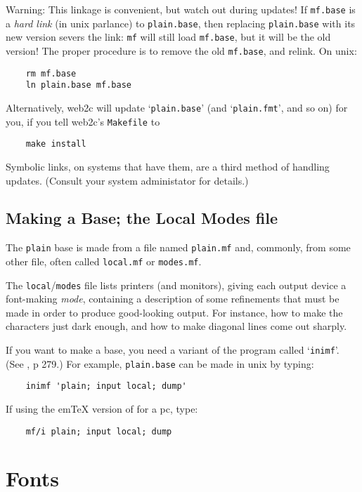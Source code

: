 {\sc Warning:}
This linkage is convenient, but watch out during updates!
If {\tt mf.base} is a {\em hard link} (in {\sc unix} parlance)
to {\tt plain.base}, then replacing {\tt plain.base} with its
new version severs the link:  {\tt mf} will still load {\tt mf.base},
but it will be the old version!  The proper procedure is to remove
the old {\tt mf.base}, and relink.  On {\sc unix}:
\begin{verbatim}
    rm mf.base
    ln plain.base mf.base
\end{verbatim}
Alternatively, {\sf web2c} will update `{\tt plain.base}'
(and `{\tt plain.fmt}', and so on) for you,
if you tell {\sf web2c\/}'s {\tt Makefile}  to
\begin{verbatim}
    make install
\end{verbatim}
Symbolic links, on systems that have them, are a third method
of handling updates.  (Consult your system administator for details.)


\subsection{Making a Base; the Local Modes file}\label{sub:modes}

The {\tt plain} base is made from a \MF{} file named
{\tt plain.mf} and, commonly, from some other file, often called
{\tt local.mf} or {\tt modes.mf}.

The {\tt local}/{\tt modes} file lists printers (and monitors), giving
each output device a font-making {\em mode\/}, containing a
description of some refinements that must be made in order to produce
good-looking output.  For instance, how to make the characters just
dark enough, and how to make diagonal lines come out sharply.

If you want to make a base, you need a variant of the \MF{} program
called `{\tt inimf}'.  (See \MFbook{}, p 279.)  For example,
{\tt plain.base} can be made in {\sc unix} by typing:
\begin{verbatim}
    inimf 'plain; input local; dump'
\end{verbatim}
If using the em\TeX{} version of \MF{} for a {\sc pc}, type:
\begin{verbatim}
    mf/i plain; input local; dump
\end{verbatim}


\section{Fonts}\label{sec:fonts}


